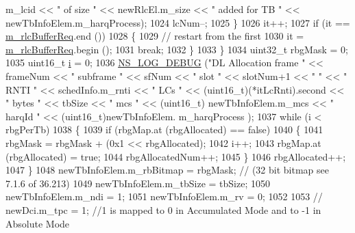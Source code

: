\begin{DoxyCode}
{      m\_lcid << \textcolor{stringliteral}{" of size "} << newRlcEl.m\_size << \textcolor{stringliteral}{" added for TB "} << newTbInfoElem.m\_harqProcess);
1024                                 lcNum--;
1025                         \}
1026                         it++;
1027                         \textcolor{keywordflow}{if} (it == \hyperlink{classns3_1_1MmWaveRrMacScheduler_a4808ca626b0b12682c3f1a079d016997}{m\_rlcBufferReq}.end ())
1028                         \{
1029                                 \textcolor{comment}{// restart from the first}
1030                                 it = \hyperlink{classns3_1_1MmWaveRrMacScheduler_a4808ca626b0b12682c3f1a079d016997}{m\_rlcBufferReq}.begin ();
1031                                 \textcolor{keywordflow}{break};
1032                         \}
1033                 \}
1034                 uint32\_t rbgMask = 0;
1035                 uint16\_t \hyperlink{bernuolliDistribution_8m_a6f6ccfcf58b31cb6412107d9d5281426}{i} = 0;
1036                 \hyperlink{group__logging_ga413f1886406d49f59a6a0a89b77b4d0a}{NS\_LOG\_DEBUG} (\textcolor{stringliteral}{"DL Allocation frame "} << frameNum << \textcolor{stringliteral}{" subframe "} << sfNum << \textcolor{stringliteral}{"
       slot "} << slotNum+1 << \textcolor{stringliteral}{" "} << \textcolor{stringliteral}{" RNTI "} << schedInfo.m\_rnti << \textcolor{stringliteral}{" LCs "} << (uint16\_t)(*itLcRnti).second << \textcolor{stringliteral}{"
       bytes "} << tbSize << \textcolor{stringliteral}{" mcs "} << (uint16\_t) newTbInfoElem.m\_mcs << \textcolor{stringliteral}{" harqId "} << (uint16\_t)newTbInfoElem.
      m\_harqProcess );
1037                 \textcolor{keywordflow}{while} (i < rbgPerTb)
1038                 \{
1039                         \textcolor{keywordflow}{if} (rbgMap.at (rbgAllocated) == \textcolor{keyword}{false})
1040                         \{
1041                                 rbgMask = rbgMask + (0x1 << rbgAllocated);
1042                                 i++;
1043                                 rbgMap.at (rbgAllocated) = \textcolor{keyword}{true};
1044                                 rbgAllocatedNum++;
1045                         \}
1046                         rbgAllocated++;
1047                 \}
1048                 newTbInfoElem.m\_rbBitmap = rbgMask; \textcolor{comment}{// (32 bit bitmap see 7.1.6 of 36.213)}
1049                 newTbInfoElem.m\_tbSize = tbSize;
1050                 newTbInfoElem.m\_ndi = 1;
1051                 newTbInfoElem.m\_rv = 0;
1052 
1053                 \textcolor{comment}{// newDci.m\_tpc = 1; //1 is mapped to 0 in Accumulated Mode and to -1 in Absolute Mode}
}
\end{DoxyCode}
